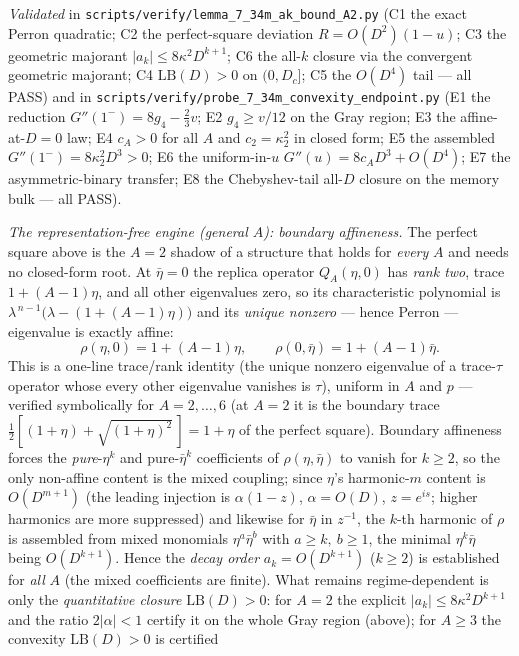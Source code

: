 \documentclass[
]{article}
\begin{document}
\emph{Validated} in
\texttt{scripts/verify/lemma\_7\_34m\_ak\_bound\_A2.py} (C1 the exact Perron
quadratic; C2 the perfect-square deviation $R=O(D^2)(1-u)$; C3 the geometric
majorant $|a_k|\le8\kappa^2 D^{k+1}$; C6 the all-$k$ closure via the convergent
geometric majorant; C4 $\mathrm{LB}(D)>0$ on $(0,D_c]$; C5 the $O(D^4)$ tail ---
all PASS) and in
\texttt{scripts/verify/probe\_7\_34m\_convexity\_endpoint.py} (E1 the reduction
$G''(1^-)=8g_4-\tfrac23 v$; E2 $g_4\ge v/12$ on the Gray region; E3 the
affine-at-$D{=}0$ law; E4 $c_A>0$ for all $A$ and $c_2=\kappa_2^2$ in closed
form; E5 the assembled $G''(1^-)=8\kappa_2^2 D^3>0$; E6 the uniform-in-$u$
$G''(u)=8c_A D^3+O(D^4)$; E7 the asymmetric-binary transfer; E8 the
Chebyshev-tail all-$D$ closure on the memory bulk --- all PASS).

\emph{The representation-free engine (general $A$): boundary affineness.} The
perfect square above is the $A=2$ shadow of a structure that holds for \emph{every}
$A$ and needs no closed-form root. At $\bar\eta=0$ the replica operator
$Q_A(\eta,0)$ has \emph{rank two}, trace $1+(A-1)\eta$, and all other eigenvalues
zero, so its characteristic polynomial is $\lambda^{\,n-1}\bigl(\lambda-(1+(A-1)
\eta)\bigr)$ and its \emph{unique nonzero} --- hence Perron --- eigenvalue is
exactly affine:
\[
  \rho(\eta,0)=1+(A-1)\eta,\qquad \rho(0,\bar\eta)=1+(A-1)\bar\eta .
\]
This is a one-line trace/rank identity (the unique nonzero eigenvalue of a
trace-$\tau$ operator whose every other eigenvalue vanishes is $\tau$), uniform in
$A$ and $p$ --- verified symbolically for $A=2,\dots,6$ (at $A=2$ it is the
boundary trace $\tfrac12[(1+\eta)+\sqrt{(1+\eta)^2}\,]=1+\eta$ of the perfect
square). Boundary affineness forces the \emph{pure}-$\eta^k$ and pure-$\bar\eta^k$
coefficients of $\rho(\eta,\bar\eta)$ to vanish for $k\ge2$, so the only non-affine
content is the mixed coupling; since $\eta$'s harmonic-$m$ content is $O(D^{m+1})$
(the leading injection is $\alpha(1-z)$, $\alpha=O(D)$, $z=e^{is}$; higher
harmonics are more suppressed) and likewise for $\bar\eta$ in $z^{-1}$, the $k$-th
harmonic of $\rho$ is assembled from mixed monomials $\eta^a\bar\eta^b$ with $a\ge
k,\ b\ge1$, the minimal $\eta^k\bar\eta$ being $O(D^{k+1})$. Hence the \emph{decay
order} $a_k=O(D^{k+1})$ ($k\ge2$) is established for \emph{all} $A$ (the mixed
coefficients are finite). What remains regime-dependent is only the
\emph{quantitative closure} $\mathrm{LB}(D)>0$: for $A=2$ the explicit
$|a_k|\le8\kappa^2 D^{k+1}$ and the ratio $2|\alpha|<1$ certify it on the whole
Gray region (above); for $A\ge3$ the convexity $\mathrm{LB}(D)>0$ is certified
\end{document}
